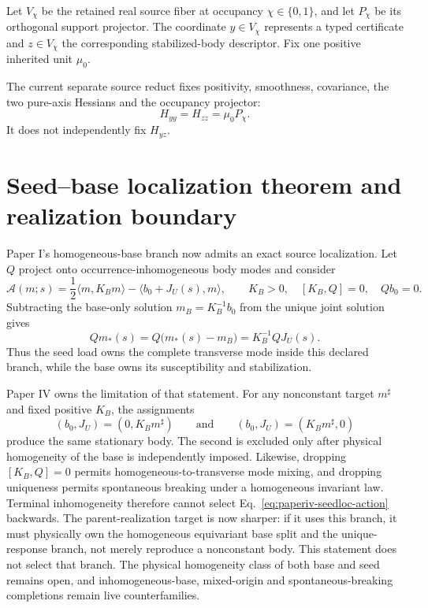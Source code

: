 \documentclass[11pt]{article}
\begin{document}
Let \(V_\chi\) be the retained real source fiber at occupancy
\(\chi\in\{0,1\}\), and let \(P_\chi\) be its orthogonal support projector.
The coordinate \(y\in V_\chi\) represents a typed certificate and
\(z\in V_\chi\) the corresponding stabilized-body descriptor.  Fix one
positive inherited unit \(\mu_0\).

The current separate source reduct fixes positivity, smoothness, covariance,
the two pure-axis Hessians and the occupancy projector:
\begin{equation}
 H_{yy}=H_{zz}=\mu_0P_\chi.
 \label{eq:pure-axis-data}
\end{equation}
It does not independently fix \(H_{yz}\).

\section{Seed--base localization theorem and realization boundary}

Paper I's homogeneous-base branch now admits an exact source localization.
Let $Q$ project onto occurrence-inhomogeneous body modes and consider
\begin{equation}
 \mathcal A(m;s)=\frac12\langle m,K_Bm\rangle
 -\langle b_0+J_U(s),m\rangle,
 \qquad K_B>0,\quad [K_B,Q]=0,\quad Qb_0=0.
 \label{eq:paperiv-seedloc-action}
\end{equation}
Subtracting the base-only solution $m_B=K_B^{-1}b_0$ from the unique joint
solution gives
\begin{equation}
 \boxed{Qm_*(s)=Q\bigl(m_*(s)-m_B\bigr)=K_B^{-1}QJ_U(s).}
 \label{eq:paperiv-seedloc}
\end{equation}
Thus the seed load owns the complete transverse mode inside this declared
branch, while the base owns its susceptibility and stabilization.

Paper IV owns the limitation of that statement. For any nonconstant target
$m^\sharp$ and fixed positive $K_B$, the assignments
\begin{equation}
 (b_0,J_U)=(0,K_Bm^\sharp)
 \qquad\text{and}\qquad
 (b_0,J_U)=(K_Bm^\sharp,0)
 \label{eq:paperiv-seed-base-counterpair}
\end{equation}
produce the same stationary body. The second is excluded only after physical
homogeneity of the base is independently imposed. Likewise, dropping
$[K_B,Q]=0$ permits homogeneous-to-transverse mode mixing, and dropping
uniqueness permits spontaneous breaking under a homogeneous invariant law.
Terminal inhomogeneity therefore cannot select
Eq.~\eqref{eq:paperiv-seedloc-action} backwards. The parent-realization target
is now sharper: if it uses this branch, it must physically own the homogeneous
equivariant base split and the unique-response branch, not merely reproduce a
nonconstant body. This statement does not select that branch. The physical
homogeneity class of both base and seed remains open, and inhomogeneous-base,
mixed-origin and spontaneous-breaking completions remain live counterfamilies.
\end{document}
